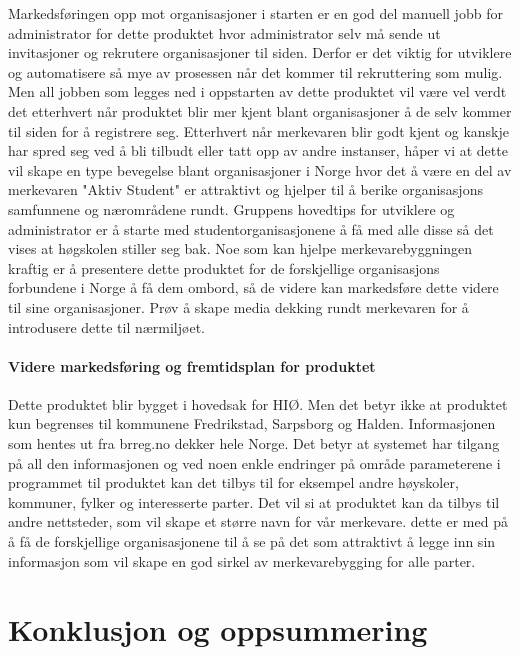 Markedsføringen opp mot organisasjoner i starten er en god del manuell jobb for administrator for dette produktet hvor administrator selv må sende ut invitasjoner og rekrutere organisasjoner til siden. Derfor er det viktig for utviklere og automatisere så mye av prosessen når det kommer til rekruttering som mulig. Men all jobben som legges ned i oppstarten av dette produktet vil være vel verdt det etterhvert når produktet blir mer kjent blant organisasjoner å de selv kommer til siden for å registrere seg. Etterhvert når merkevaren blir godt kjent og kanskje har spred seg ved å bli tilbudt eller tatt opp av andre instanser, håper vi at dette vil skape en type bevegelse blant organisasjoner i Norge hvor det å være en del av merkevaren "Aktiv Student" er attraktivt og hjelper til å berike organisasjons samfunnene og nærområdene rundt. Gruppens hovedtips for utviklere og administrator er å starte med studentorganisasjonene å få med alle disse så det vises at høgskolen stiller seg bak. Noe som kan hjelpe merkevarebyggningen kraftig er å presentere dette produktet for de forskjellige organisasjons forbundene i Norge å få dem ombord, så de videre kan markedsføre dette videre til sine organisasjoner. Prøv å skape media dekking rundt merkevaren for å introdusere dette til nærmiljøet. 

\paragraph{Videre markedsføring og fremtidsplan for produktet}

Dette produktet blir bygget i hovedsak for HIØ. Men det betyr ikke at produktet kun begrenses til kommunene Fredrikstad, Sarpsborg og Halden. Informasjonen som hentes ut fra brreg.no dekker hele Norge. Det betyr at systemet har tilgang på all den informasjonen og ved noen enkle endringer på område parameterene i programmet til produktet kan det tilbys til for eksempel andre høyskoler, kommuner, fylker og interesserte parter. Det vil si at produktet kan da tilbys til andre nettsteder, som vil skape et større navn for vår merkevare. dette er med på å få de forskjellige organisasjonene til å se på det som attraktivt å legge inn sin informasjon som vil skape en god sirkel av merkevarebygging for alle parter.


\section{Konklusjon og oppsummering}







